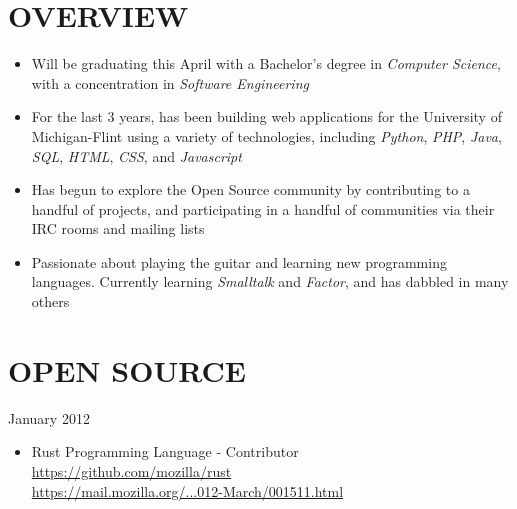 \documentclass[line,margin]{res}
\begin{document}

\address{1450 Schafer Drive, Burton, MI 48509}
\address{pwoolcoc@gmail.com\ -\ (810) 412-8642}


\begin{resume}


\section{OVERVIEW}
    \begin{itemize}
        \item Will be graduating this April with a Bachelor's degree in
              {\sl Computer Science}, with a concentration in
              {\sl Software Engineering}
        \item For the last 3 years, has been building web applications
              for the University of Michigan-Flint using a variety of
              technologies, including {\sl Python}, {\sl PHP}, {\sl Java},
              {\sl SQL}, {\sl HTML}, {\sl CSS}, and {\sl Javascript}
        \item Has begun to explore the Open Source community by contributing to
              a handful of projects, and participating in a handful
              of communities via their IRC rooms and mailing lists
        \item Passionate about playing the guitar and learning new programming
              languages. Currently learning {\sl Smalltalk} and {\sl Factor},
              and has dabbled in many others
    \end{itemize}



\section{OPEN SOURCE} \hfill January 2012
    \begin{itemize}
        \item Rust Programming Language - Contributor \\
              \href{https://github.com/mozilla/rust}{https://github.com/mozilla/rust} \\
              \href{https://mail.mozilla.org/pipermail/rust-dev/2012-March/001511.html}{https://mail.mozilla.org/...012-March/001511.html}
    \end{itemize}


\end{resume}
\end{document}
